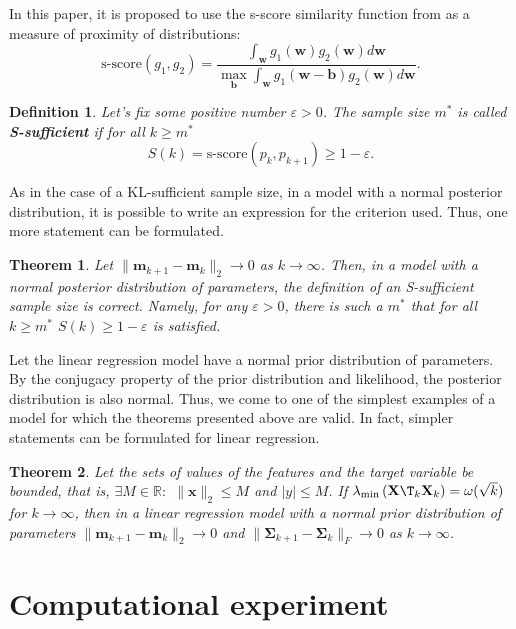 \documentclass[sn-mathphys-num]{sn-jnl}%
\newtheorem{theorem}{Theorem}%
\newtheorem{definition}{Definition}%
\begin{document}
In this paper, it is proposed to use the s-score similarity function from \cite{Aduenko2017} as a measure of proximity of distributions:
\[\text{s-score}(g_1, g_2) = \frac{\int_{\mathbf{w}} g_1(\mathbf{w}) g_2(\mathbf{w}) d\mathbf{w}}{\max_{\mathbf{b}} \int_{\mathbf{w}} g_1(\mathbf{w} - \mathbf{b}) g_2(\mathbf{w}) d\mathbf{w}}. \]

\begin{definition}
    Let's fix some positive number $\varepsilon > 0$. The sample size $m^*$ is called \textbf{S-sufficient} if for all $k\geqslant m^*$
    \[ S(k) = \text{s-score}(p_k, p_{k+1}) \geqslant 1-\varepsilon. \]
\end{definition}

As in the case of a KL-sufficient sample size, in a model with a normal posterior distribution, it is possible to write an expression for the criterion used. Thus, one more statement can be formulated.

\begin{theorem}\label{theorem2}
    Let $\|\mathbf{m}_{k+1} - \mathbf{m}_k\|_2\to 0$ as $k \to \infty$. Then, in a model with a normal posterior distribution of parameters, the definition of an S-sufficient sample size is correct. Namely, for any $\varepsilon > 0$, there is such a $m^*$ that for all $k\geqslant m^*$ $S(k)\geqslant 1-\varepsilon$ is satisfied.
\end{theorem}

Let the linear regression model have a normal prior distribution of parameters. By the conjugacy property of the prior distribution and likelihood, the posterior distribution is also normal. Thus, we come to one of the simplest examples of a model for which the theorems presented above are valid. In fact, simpler statements can be formulated for linear regression.

\begin{theorem}\label{theorem3}
    Let the sets of values of the features and the target variable be bounded, that is, $\exists M\in \mathbb{R}:$ $\|\mathbf{x}\|_2\leqslant M$ and $|y|\leqslant M$. If $\lambda_{\min}\left(\mathbf{X}\T_k \mathbf{X}_k \right) = \omega(\sqrt{k})$ for $k\to \infty$, then in a linear regression model with a normal prior distribution of parameters $\|\mathbf{m}_{k+1} - \mathbf{m}_k\|_2\to 0$ and $\|\mathbf{\Sigma}_{k+1} - \mathbf{\Sigma}_k\|_{F}\to 0$ as $k\to \infty$.
\end{theorem}

\section{Computational experiment}
\end{document}
